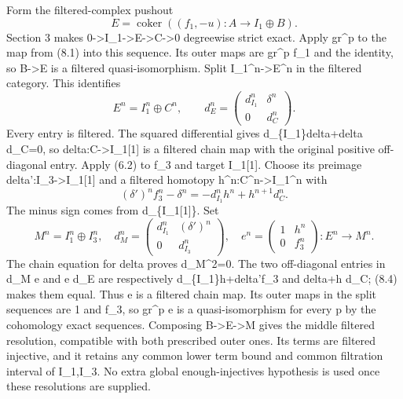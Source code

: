 \documentclass[11pt]{article}
\begin{document}
Form the filtered-complex pushout \[
 E=\operatorname{coker}
       ((f_1,-u):A\to I_1\oplus B).                          \tag{8.2}
\] Section 3 makes 0\allowbreak{}->I\_\allowbreak{}1\allowbreak{}->E\allowbreak{}->C\allowbreak{}->0 degreewise strict exact. Apply gr\^{}p to the map from (8.1)\allowbreak{} into this sequence. Its outer maps are gr\^{}p f\_\allowbreak{}1 and the identity,\allowbreak{} so B\allowbreak{}->E is a filtered quasi-isomorphism. Split I\_\allowbreak{}1\textasciicircum{}n\allowbreak{}->E\textasciicircum{}n in the filtered category. This identifies \[
 E^n=I_1^n\oplus C^n,\qquad
 d_E^n=\begin{pmatrix}d_{I_1}^n&\delta^n\\0&d_C^n\end{pmatrix}.
                                                               \tag{8.3}
\] Every entry is filtered. The squared differential gives d\_\allowbreak{}\{I\_\allowbreak{}1\}delta\allowbreak{}+delta d\_\allowbreak{}C\allowbreak{}=0,\allowbreak{} so delta:\allowbreak{}C\allowbreak{}->I\_\allowbreak{}1[1]\allowbreak{} is a filtered chain map with the original positive off-diagonal entry. Apply (6.2)\allowbreak{} to f\_\allowbreak{}3 and target I\_\allowbreak{}1[1]\allowbreak{}. Choose its preimage delta':\allowbreak{}I\_\allowbreak{}3\allowbreak{}->I\_\allowbreak{}1[1]\allowbreak{} and a filtered homotopy h\textasciicircum{}n:\allowbreak{}C\textasciicircum{}n\allowbreak{}->I\_\allowbreak{}1\textasciicircum{}n with \[
 (\delta')^n f_3^n-\delta^n
      =-d_{I_1}^n h^n+h^{n+1}d_C^n.                         \tag{8.4}
\] The minus sign comes from d\_\allowbreak{}\{I\_\allowbreak{}1[1]\allowbreak{}\}. Set \[
 M^n=I_1^n\oplus I_3^n,\quad
 d_M^n=\begin{pmatrix}d_{I_1}^n&(\delta')^n\\0&d_{I_3}^n\end{pmatrix},
 \quad
 e^n=
 \begin{pmatrix}1&h^n\\0&f_3^n\end{pmatrix}:E^n\to M^n.        \tag{8.5}
\] The chain equation for delta\textquotesingle{} proves d\_\allowbreak{}M\textasciicircum{}2\allowbreak{}=0. The two off-diagonal entries in d\_\allowbreak{}M e and e d\_\allowbreak{}E are respectively d\_\allowbreak{}\{I\_\allowbreak{}1\}h\allowbreak{}+delta'f\_\allowbreak{}3 and delta\allowbreak{}+h d\_\allowbreak{}C; (8.4)\allowbreak{} makes them equal. Thus e is a filtered chain map. Its outer maps in the split sequences are 1 and f\_\allowbreak{}3,\allowbreak{} so gr\^{}p e is a quasi-isomorphism for every p by the cohomology exact sequences. Composing B\allowbreak{}->E\allowbreak{}->M gives the middle filtered resolution,\allowbreak{} compatible with both prescribed outer ones. Its terms are filtered injective,\allowbreak{} and it retains any common lower term bound and common filtration interval of I\_\allowbreak{}1,\allowbreak{}I\_\allowbreak{}3. No extra global enough-injectives hypothesis is used once these resolutions are supplied.
\end{document}
